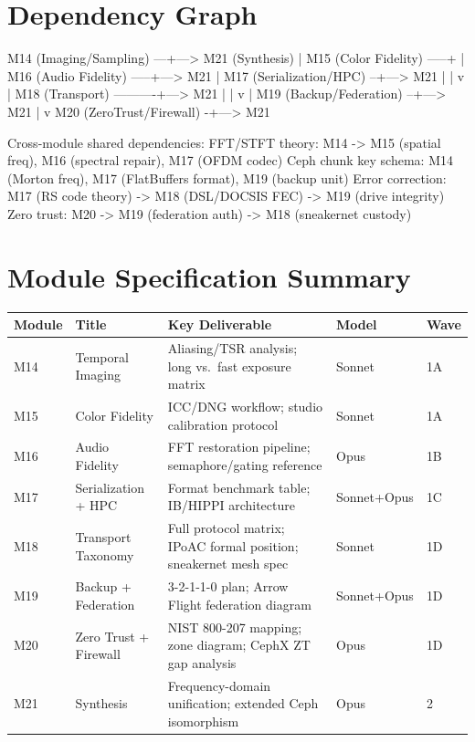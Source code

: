 \documentclass[11pt,letterpaper]{article}
\newenvironment{asciibox}{%
  \begin{tcolorbox}[colback=MidGray!8,colframe=MidGray!40,arc=2pt,left=6pt,right=6pt,top=4pt,bottom=4pt,breakable]
  \ttfamily\small
}{%
  \end{tcolorbox}
}
\newcommand{\thead}[1]{\cellcolor{TableHead}\textbf{\sffamily\color{white}\small #1}}
\newcommand{\altrow}{\rowcolor{TableAlt}}
\begin{document}
\section{Dependency Graph}

\begin{asciibox}
M14 (Imaging/Sampling) ---+---> M21 (Synthesis)
                          |
M15 (Color Fidelity) -----+
                          |
M16 (Audio Fidelity) -----+---> M21
                          |
M17 (Serialization/HPC) --+---> M21
         |                |
         v                |
M18 (Transport) ----------+---> M21
         |                |
         v                |
M19 (Backup/Federation) --+---> M21
         |
         v
M20 (ZeroTrust/Firewall) -+---> M21

Cross-module shared dependencies:
  FFT/STFT theory: M14 -> M15 (spatial freq), M16 (spectral repair), M17 (OFDM codec)
  Ceph chunk key schema: M14 (Morton freq), M17 (FlatBuffers format), M19 (backup unit)
  Error correction: M17 (RS code theory) -> M18 (DSL/DOCSIS FEC) -> M19 (drive integrity)
  Zero trust: M20 -> M19 (federation auth) -> M18 (sneakernet custody)
\end{asciibox}

\section{Module Specification Summary}

\begin{longtable}{p{1.5cm}p{3.5cm}p{5cm}p{1.5cm}p{1.5cm}}
\toprule
\thead{Module} & \thead{Title} & \thead{Key Deliverable} & \thead{Model} & \thead{Wave} \\
\midrule
\endhead
M14 & Temporal Imaging & Aliasing/TSR analysis; long vs.\ fast exposure matrix & Sonnet & 1A \\
\altrow M15 & Color Fidelity & ICC/DNG workflow; studio calibration protocol & Sonnet & 1A \\
M16 & Audio Fidelity & FFT restoration pipeline; semaphore/gating reference & Opus & 1B \\
\altrow M17 & Serialization + HPC & Format benchmark table; IB/HIPPI architecture & Sonnet+Opus & 1C \\
M18 & Transport Taxonomy & Full protocol matrix; IPoAC formal position; sneakernet mesh spec & Sonnet & 1D \\
\altrow M19 & Backup + Federation & 3-2-1-1-0 plan; Arrow Flight federation diagram & Sonnet+Opus & 1D \\
M20 & Zero Trust + Firewall & NIST 800-207 mapping; zone diagram; CephX ZT gap analysis & Opus & 1D \\
\altrow M21 & Synthesis & Frequency-domain unification; extended Ceph isomorphism & Opus & 2 \\
\bottomrule
\end{longtable}
\end{document}
